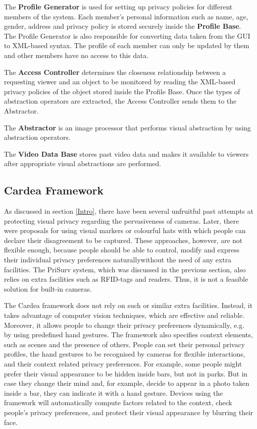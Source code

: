\documentclass[conference]{IEEEtran}
\begin{document}
The \textbf{Profile Generator} is used for setting up privacy policies for different members of the system. Each member's personal information such as name, age, gender, address and privacy policy is stored securely inside the \textbf{Profile Base}. The Profile Generator is also responsible for converting data taken from the GUI to \ac{XML}-based syntax. The profile of each member can only be updated by them and other members have no access to this data. 

The \textbf{Access Controller} determines the closeness relationship between a requesting viewer and an object to be monitored by reading the \ac{XML}-based privacy policies of the object stored inside the Profile Base. Once the types of abstraction operators are extracted, the Access Controller sends them to the Abstractor. 

The \textbf{Abstractor} is an image processor that performs visual abstraction by using abstraction operators. 

The \textbf{Video Data Base} stores past video data and makes it available to viewers after appropriate visual abstractions are performed. 

\subsection{Cardea Framework}\label{Cardea}
As discussed in section \ref{Intro}, there have been several unfruitful past attempts at protecting visual privacy regarding the pervasiveness of cameras. Later, there were proposals for using visual markers \cite{roesner2014, liu2014} or colourful hats \cite{sastry2007} with which people can declare their disagreement to be captured. These approaches, however, are not flexible enough, because people should be able to control, modify and express their individual privacy preferences naturally\textemdash without the need of any extra facilities. The PriSurv system, which was discussed in the previous section, also relies on extra facilities such as \ac{RFID}-tags and readers. Thus, it is not a feasible solution for built-in cameras. 

The Cardea framework \cite{shu2016cardea} does not rely on such or similar extra facilities. Instead, it takes advantage of computer vision techniques, which are effective and reliable. Moreover, it allows people to change their privacy preferences dynamically, e.g. by using predefined hand gestures. The framework also specifies context elements, such as scenes and the presence of others. People can set their personal privacy profiles, the hand gestures to be recognised by cameras for flexible interactions, and their context related privacy preferences. For example, some people might prefer their visual appearance to be hidden inside bars, but not in parks. But in case they change their mind and, for example, decide to appear in a photo taken inside a bar, they can indicate it with a hand gesture. Devices using the framework will automatically compute factors related to the context, check people's privacy preferences, and protect their visual appearance by blurring their face.
\end{document}
